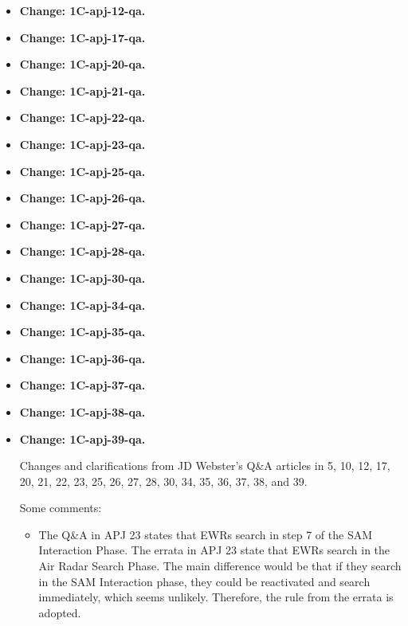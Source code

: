 \documentclass{report}
\newcommand{\changetag}[1]{\textbf{Change: #1.}\par}
\begin{document}
\begin{itemize}
    \item\changetag{1C-apj-12-qa}

    \item\changetag{1C-apj-17-qa}

    \item\changetag{1C-apj-20-qa}

    \item\changetag{1C-apj-21-qa}

    \item\changetag{1C-apj-22-qa}

    \item\changetag{1C-apj-23-qa}

    \item\changetag{1C-apj-25-qa}

    \item\changetag{1C-apj-26-qa}

    \item\changetag{1C-apj-27-qa}

    \item\changetag{1C-apj-28-qa}

    \item\changetag{1C-apj-30-qa}

    \item\changetag{1C-apj-34-qa}

    \item\changetag{1C-apj-35-qa}

    \item\changetag{1C-apj-36-qa}

    \item\changetag{1C-apj-37-qa}

    \item\changetag{1C-apj-38-qa}

    \item\changetag{1C-apj-39-qa}

        Changes and clarifications from JD Webster’s Q\&A articles in {\APJ} 5, 10, 12, 17, 20, 21, 22, 23, 25, 26, 27, 28, 30, 34, 35, 36, 37, 38, and 39.

        Some comments:

        \begin{itemize}
            \item The Q\&A in APJ 23 states that EWRs search in step 7 of the SAM Interaction Phase. The errata in APJ 23 state that EWRs search in the Air Radar Search Phase. The main difference would be that if they search in the SAM Interaction phase, they could be reactivated and search immediately, which seems unlikely. Therefore, the rule from the errata is adopted.
        \end{itemize}


\end{itemize}
\end{document}
